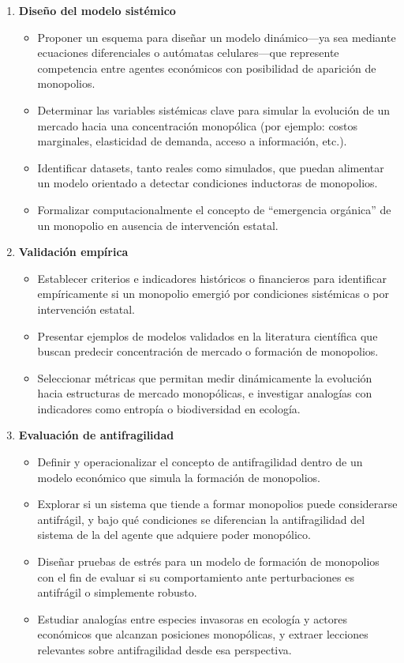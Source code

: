 \documentclass[a4paper,12pt]{article}
\begin{document}
\begin{enumerate}
\begin{enumerate}
    \item \textbf{Diseño del modelo sistémico}
    \begin{itemize}
        \item Proponer un esquema para diseñar un modelo dinámico—ya sea mediante ecuaciones diferenciales o autómatas celulares—que represente competencia entre agentes económicos con posibilidad de aparición de monopolios.
        \item Determinar las variables sistémicas clave para simular la evolución de un mercado hacia una concentración monopólica (por ejemplo: costos marginales, elasticidad de demanda, acceso a información, etc.).
        \item Identificar datasets, tanto reales como simulados, que puedan alimentar un modelo orientado a detectar condiciones inductoras de monopolios.
        \item Formalizar computacionalmente el concepto de “emergencia orgánica” de un monopolio en ausencia de intervención estatal.
    \end{itemize}

    \item \textbf{Validación empírica}
    \begin{itemize}
        \item Establecer criterios e indicadores históricos o financieros para identificar empíricamente si un monopolio emergió por condiciones sistémicas o por intervención estatal.
        \item Presentar ejemplos de modelos validados en la literatura científica que buscan predecir concentración de mercado o formación de monopolios.
        \item Seleccionar métricas que permitan medir dinámicamente la evolución hacia estructuras de mercado monopólicas, e investigar analogías con indicadores como entropía o biodiversidad en ecología.
    \end{itemize}

    \item \textbf{Evaluación de antifragilidad}
    \begin{itemize}
        \item Definir y operacionalizar el concepto de antifragilidad dentro de un modelo económico que simula la formación de monopolios.
        \item Explorar si un sistema que tiende a formar monopolios puede considerarse antifrágil, y bajo qué condiciones se diferencian la antifragilidad del sistema de la del agente que adquiere poder monopólico.
        \item Diseñar pruebas de estrés para un modelo de formación de monopolios con el fin de evaluar si su comportamiento ante perturbaciones es antifrágil o simplemente robusto.
        \item Estudiar analogías entre especies invasoras en ecología y actores económicos que alcanzan posiciones monopólicas, y extraer lecciones relevantes sobre antifragilidad desde esa perspectiva.
    \end{itemize}


\end{enumerate}
\end{enumerate}
\end{document}
